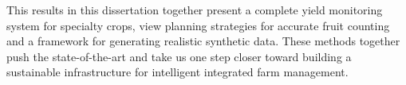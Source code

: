 This results in this dissertation together present a complete yield monitoring system for specialty crops, view planning strategies for accurate fruit counting and a framework for generating realistic synthetic data. These methods together push the state-of-the-art and take us one step closer toward building a sustainable infrastructure for intelligent integrated farm management.